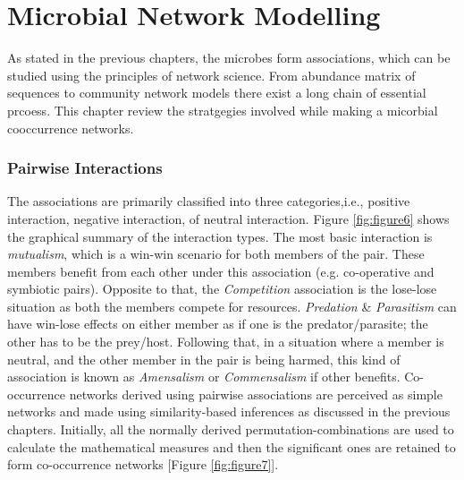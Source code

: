 \chapter{Microbial Network Modelling}
 \setcounter{page}{21}

As stated in the previous chapters, the microbes form associations, which can be studied using the principles of network science. From abundance matrix of sequences to community network models there exist a long chain of essential prcoess. This chapter review the stratgegies involved while making a micorbial cooccurrence networks.

\subsection{Pairwise Interactions}
The associations are primarily classified into three categories,i.e., positive interaction, negative interaction, of neutral interaction. Figure \ref{fig:figure6} shows the graphical summary of the interaction types. The most basic interaction is \emph{mutualism}, which is a win-win scenario for both members of the pair. These members benefit from each other under this association (e.g. co-operative and symbiotic pairs). Opposite to that, the \emph{Competition} association is the lose-lose situation as both the members compete for resources. \emph{Predation} \& \emph{Parasitism} can have win-lose effects on either member as if one is the predator/parasite; the other has to be the prey/host. Following that, in a situation where a member is neutral, and the other member in the pair is being harmed, this kind of association is known as \emph{Amensalism} or \emph{Commensalism} if other benefits. Co-occurrence networks derived using pairwise associations are perceived as simple networks and made using similarity-based inferences as discussed in the previous chapters. Initially, all the normally derived permutation-combinations are used to calculate the mathematical measures and then the significant ones are retained to form co-occurrence networks [Figure \ref{fig:figure7}].

